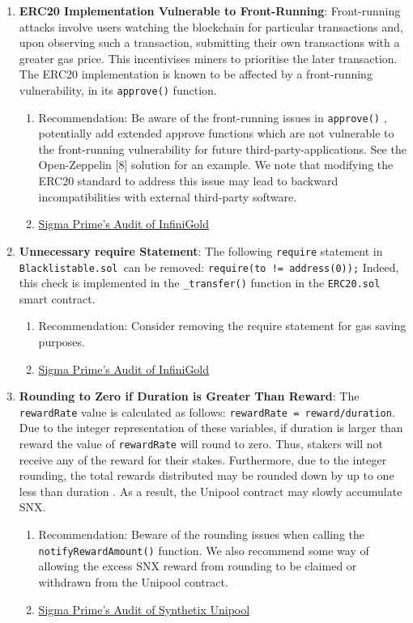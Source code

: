 \begin{enumerate}
\item\textbf{ERC20 Implementation Vulnerable to Front-Running}: Front-running attacks involve users watching the blockchain for particular transactions and, upon observing such a transaction, submitting their own transactions with a greater gas price. This incentivises miners to prioritise the later transaction. The ERC20 implementation is known to be affected by a front-running vulnerability, in its \verb|approve()| function.
	\begin{enumerate}
	\item Recommendation: Be aware of the front-running issues in \verb|approve()| , potentially add extended approve functions which are not vulnerable to the front-running vulnerability for future third-party-applications. See the Open-Zeppelin [8] solution for an example. We note that modifying the ERC20 standard to address this issue may lead to backward incompatibilities with external third-party software.
	\item\href{https://github.com/sigp/public-audits/raw/master/infinigold/review.pdf}{Sigma Prime's Audit of InfiniGold}
	\end{enumerate}

\item\textbf{Unnecessary require Statement}: The following \verb|require| statement in \verb|Blacklistable.sol |can be removed: \verb|require(to != address(0));| Indeed, this check is implemented in the \verb|_transfer()| function in the \verb|ERC20.sol| smart contract.
	\begin{enumerate}
	\item Recommendation: Consider removing the require statement for gas saving purposes.
	\item\href{https://github.com/sigp/public-audits/raw/master/infinigold/review.pdf}{Sigma Prime's Audit of InfiniGold}
	\end{enumerate}

\item\textbf{Rounding to Zero if Duration is Greater Than Reward}: The \verb|rewardRate| value is calculated as follows: \verb|rewardRate = reward/duration|. Due to the integer representation of these variables, if duration is larger than reward the value of \verb|rewardRate| will round to zero. Thus, stakers will not receive any of the reward for their stakes. Furthermore, due to the integer rounding, the total rewards distributed may be rounded down by up to one less than duration . As a result, the Unipool contract may slowly accumulate SNX.
	\begin{enumerate}
	\item Recommendation: Beware of the rounding issues when calling the \verb|notifyRewardAmount()| function. We also recommend some way of allowing the excess SNX reward from rounding to be claimed or withdrawn from the Unipool contract.
	\item\href{https://github.com/sigp/public-audits/blob/master/synthetix/unipool/review.pdf}{Sigma Prime's Audit of Synthetix Unipool}
	\end{enumerate}


\end{enumerate}
